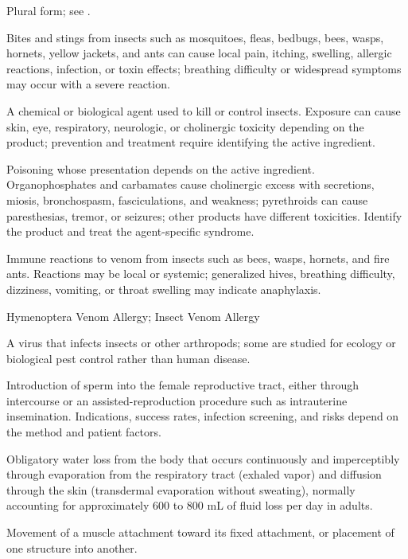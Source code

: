  Plural form; see .

 Bites and stings from insects such as mosquitoes, fleas, bedbugs, bees, wasps, hornets, yellow jackets, and ants can cause local pain, itching, swelling, allergic reactions, infection, or toxin effects; breathing difficulty or widespread symptoms may occur with a severe reaction.

 A chemical or biological agent used to kill or control insects. Exposure can cause skin, eye, respiratory, neurologic, or cholinergic toxicity depending on the product; prevention and treatment require identifying the active ingredient.

 Poisoning whose presentation depends on the active ingredient. Organophosphates and carbamates cause cholinergic excess with secretions, miosis, bronchospasm, fasciculations, and weakness; pyrethroids can cause paresthesias, tremor, or seizures; other products have different toxicities. Identify the product and treat the agent-specific syndrome.

 Immune reactions to venom from insects such as bees, wasps, hornets, and fire ants. Reactions may be local or systemic; generalized hives, breathing difficulty, dizziness, vomiting, or throat swelling may indicate anaphylaxis.

\synonyms
Hymenoptera Venom Allergy; Insect Venom Allergy

 A virus that infects insects or other arthropods; some are studied for ecology or biological pest control rather than human disease.

 Introduction of sperm into the female reproductive tract, either through intercourse or an assisted-reproduction procedure such as intrauterine insemination. Indications, success rates, infection screening, and risks depend on the method and patient factors.

 Obligatory water loss from the body that occurs continuously and imperceptibly through evaporation from the respiratory tract (exhaled vapor) and diffusion through the skin (transdermal evaporation without sweating), normally accounting for approximately 600 to 800 mL of fluid loss per day in adults.

 Movement of a muscle attachment toward its fixed attachment, or placement of one structure into another.

